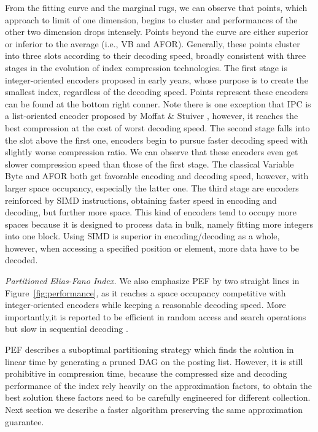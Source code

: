 \documentclass[runningheads,a4paper]{llncs}
\begin{document}
From the fitting curve and the marginal rugs, we can observe that points, which approach to limit of one dimension, begins to cluster and performances of the other two dimension drops intensely.
Points beyond the curve are either superior or inferior to the average (i.e., VB and AFOR).
Generally, these points cluster into three slots according to their decoding speed, broadly consistent with three stages in the evolution of index compression technologies.
The first stage is integer-oriented encoders proposed in early years, whose purpose is to create the smallest index, regardless of the decoding speed.
Points represent these encoders can be found at the bottom right conner.
Note there is one exception that IPC is a list-oriented encoder proposed by Moffat \& Stuiver \cite{moffat2000binary}, however, it reaches the best compression at the cost of worst decoding speed.
The second stage falls into the slot above the first one, encoders begin to pursue faster decoding speed with slightly worse compression ratio.
We can observe that these encoders even get slower compression speed than those of the first stage.
The classical Variable Byte and AFOR both get favorable encoding and decoding speed, however, with larger space occupancy, especially the latter one.
The third stage are encoders reinforced by SIMD instructions, obtaining faster speed in encoding and decoding, but further more space.
This kind of encoders tend to occupy more spaces because it is designed to process data in bulk, namely fitting more integers into one block.
Using SIMD is superior in encoding/decoding as a whole, however, when accessing a specified position or element, more data have to be decoded.

\textit{Partitioned Elias-Fano Index.}
We also emphasize PEF by two straight lines in Figure~\ref{fig:performance}, as it reaches a space occupancy competitive with integer-oriented encoders while keeping a reasonable decoding speed.
More importantly,it is reported to be efficient in random access and search operations but slow in sequential decoding \cite{ottaviano2015optimal,vigna2013quasi}.

PEF describes a suboptimal partitioning strategy which finds the solution in linear time by generating a pruned DAG on the posting list.
However, it is still prohibitive in compression time, because the compressed size and decoding performance of the index rely heavily on the approximation factors, to obtain the best solution these factors need to be carefully engineered for different collection.
Next section we describe a faster algorithm preserving the same approximation guarantee.
\end{document}
